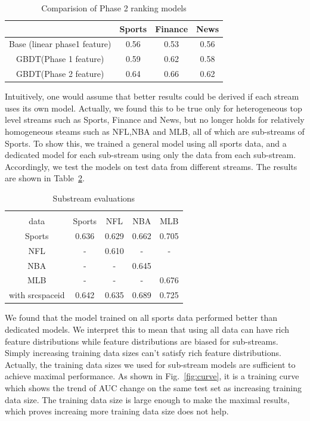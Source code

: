 \begin{table}
\caption{Comparision of Phase 2 ranking models}
\begin{tabular}{|c|c|c|c|}\hline
             & Sports & Finance & News \\ \hline
Base (linear phase1 feature) & 0.56 & 0.53 & 0.56 \\ \hline 
GBDT(Phase 1 feature)  & 0.59& 0.62& 0.58 \\ \hline
GBDT(Phase 2 feature) & 0.64 & 0.66 & 0.62 \\ \hline
\end{tabular}

\label{phase2sum}
\end{table}


Intuitively, one would assume that better results could be derived if each 
stream uses its own model. Actually, we found this to be true only for 
heterogeneous top level streams such as Sports, Finance and News, but no 
longer holds for 
relatively homogeneous steams such as NFL,NBA and MLB, all of which are 
sub-streams of Sports.  To show this, we trained a general model using all 
sports data, and a dedicated model for each sub-stream using only the data 
from each sub-stream. Accordingly, we test the models on test data from 
different streams. The results are shown in Table~\ref{tab:substream}. 

\begin{table}
\caption{Substream evaluations}
\begin{tabular}{|c|c|c|c|c|} \hline
    \diaghead{\theadfont training  test data}{training \\ data}{test  data}   & Sports & NFL & NBA & MLB \\ \hline
    Sports & 0.636 &0.629 &0.662 &0.705 \\ \hline
    NFL & - & 0.610 & - & - \\ \hline
    NBA & - & - & 0.645 & \\ \hline
   MLB & - & - & - & 0.676 \\ \hline
   with srcspaceid  & 0.642  & 0.635 &0.689 & 0.725 \\ \hline
\end{tabular}

\label{tab:substream}
\end{table}

We found that the model trained on all sports data performed better than 
dedicated models. 
We interpret this to mean that using all data can have rich feature 
distributions while feature distributions are biased for sub-streams. Simply 
increasing training data sizes can't satisfy rich feature distributions.  
Actually, the training data sizes we used for sub-stream models are 
sufficient 
to achieve maximal performance. As shown in Fig.~\ref{fig:curve}, it is a 
training curve which shows the trend of AUC change on the same test set as 
increasing training data size. The training data size is large enough to make 
the maximal results, which proves increaing more training data size does not 
help.  

